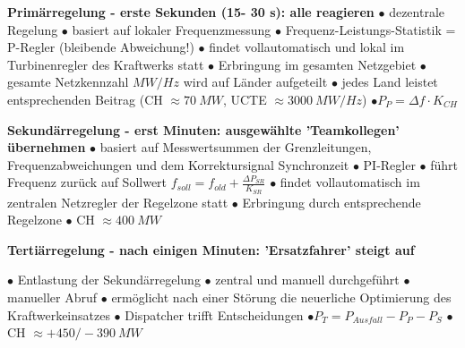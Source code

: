 		\textbf{Primärregelung - erste Sekunden (15- 30 s): alle reagieren}\newline
		$\bullet$ dezentrale Regelung  $\bullet$ basiert auf lokaler Frequenzmessung  $\bullet$ Frequenz-Leistungs-Statistik = P-Regler (bleibende Abweichung!)  $\bullet$ findet vollautomatisch und lokal im Turbinenregler des Kraftwerks statt  $\bullet$ Erbringung im gesamten Netzgebiet  $\bullet$ gesamte Netzkennzahl $MW/Hz$ wird auf Länder aufgeteilt  $\bullet$ jedes Land leistet entsprechenden Beitrag (CH $\approx 70~MW$, UCTE $\approx 3000~MW/Hz$)  $\bullet P_P = \Delta f \cdot K_{CH}$ \newline
	
		\textbf{Sekundärregelung - erst Minuten: ausgewählte 'Teamkollegen' übernehmen}\newline
		$\bullet$ basiert auf Messwertsummen der Grenzleitungen, Frequenzabweichungen und dem Korrektursignal Synchronzeit  $\bullet$ PI-Regler  $\bullet$ führt Frequenz zurück auf Sollwert $f_{soll} = f_{old} + \frac{\Delta P_{SR}}{K_{SR}}$  $\bullet$ findet vollautomatisch im zentralen Netzregler der Regelzone statt  $\bullet$ Erbringung durch entsprechende Regelzone  $\bullet$ CH $\approx 400~MW$ \newline
		
		\textbf{Tertiärregelung - nach einigen Minuten: 'Ersatzfahrer' steigt auf}\newline
		
		$\bullet$ Entlastung der Sekundärregelung  $\bullet$ zentral und manuell durchgeführt  $\bullet$ manueller Abruf  $\bullet$ ermöglicht nach einer Störung die neuerliche Optimierung des Kraftwerkeinsatzes  $\bullet$ Dispatcher trifft Entscheidungen  $\bullet P_T = P_{Ausfall} - P_P - P_S$  $\bullet$ CH $\approx +450/-390~MW$ 
		
		
